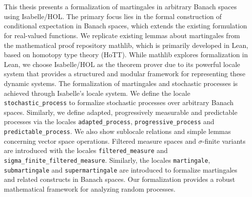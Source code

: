 ﻿\chapter{\abstractname}
This thesis presents a formalization of martingales in arbitrary Banach spaces using Isabelle/HOL. The primary focus lies in the formal construction of conditional expectation in Banach spaces, which extends the existing formulation for real-valued functions. We replicate existing lemmas about martingales from the mathematical proof repository mathlib, which is primarily developed in Lean, based on homotopy type theory (HoTT). While mathlib explores formalization in Lean, we choose Isabelle/HOL as the theorem prover due to its powerful locale system that provides a structured and modular framework for representing these dynamic systems. The formalization of martingales and stochastic processes is achieved through Isabelle's locale system. We define the locale \lstinline{stochastic_process} to formalize stochastic processes over arbitrary Banach spaces. Similarly, we define adapted, progressively measurable and predictable processes via the locales \lstinline{adapted_process}, \lstinline{progressive_process} and \lstinline{predictable_process}. We also show sublocale relations and simple lemmas concerning vector space operations. Filtered measure spaces and $\sigma$-finite variants are introduced with the locales \lstinline{filtered_measure} and \lstinline{sigma_finite_filtered_measure}. Similarly, the locales \lstinline{martingale}, \lstinline{submartingale} and \lstinline{supermartingale} are introduced to formalize martingales and related constructs in Banach spaces. Our formalization provides a robust mathematical framework for analyzing random processes.